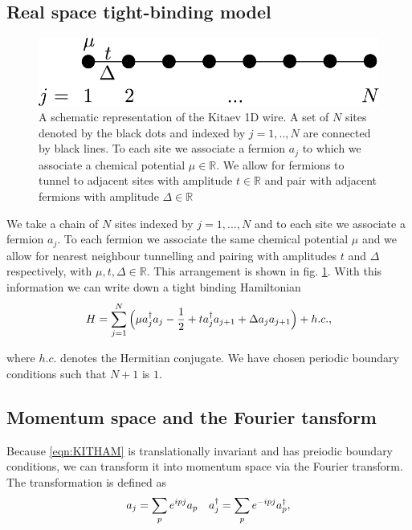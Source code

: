 \subsection{Real space tight-binding model}

\begin{figure}
    \begin{center}
        \includegraphics[scale=0.65]{Chapter1/Chapter1Figs/PDF/1DSUPCHAIN}
    \end{center}
    \caption{A schematic representation of the Kitaev 1D wire. A set of $N$ sites denoted by the black dots and indexed by $j=1,..,N$ are connected by black lines. To each site we associate a fermion $a_{j}$ to which we associate a chemical potential $\mu\in\mathbb{R}$. We allow for fermions to tunnel to adjacent sites with amplitude $t\in\mathbb{R}$ and pair with adjacent fermions with amplitude $\Delta\in\mathbb{R}$ }
    \label{fig:1DSUPCHAIN}
\end{figure}

We take a chain of $N$ sites indexed by $j=1,...,N$ and to each site we associate a fermion $a_{j}$. To each fermion we associate the same chemical potential $\mu$ and we allow for nearest neighbour tunnelling and pairing with amplitudes $t$ and $\Delta$ respectively, with $\mu,t,\Delta\in\mathbb{R}$. This arrangement is shown in fig. \ref{fig:1DSUPCHAIN}. With this information we can write down a tight binding Hamiltonian
\begin{equation}\label{eqn:KITHAM}
    H = \sum_{j=1}^{N}\Big(\mu a_{j}^{\dagger}a_{j}-\frac{1}{2} + t a_{j}^{\dagger}a_{j+1} + \Delta a_{j}a_{j+1}\Big) + h.c.,
\end{equation}

\noi where $h.c.$ denotes the Hermitian conjugate. We have chosen periodic boundary conditions such that $N+1$ is $1$.

\subsection{Momentum space and the Fourier tansform}

Because \eqref{eqn:KITHAM} is translationally invariant and has preiodic boundary conditions, we can transform it into momentum space via the Fourier transform. The transformation is defined as
\begin{align}
    &a_{j}=\sum_{p}e^{ipj}a_{p} &a_{j}^{\dagger}=\sum_{p}e^{-ipj}a^{\dagger}_{p},
\end{align}

